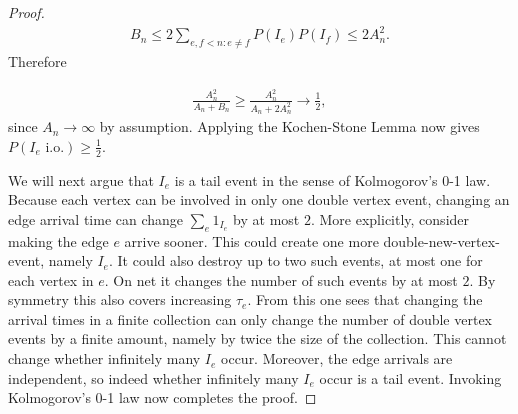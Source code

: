 \documentclass[12pt]{article}
\theoremstyle{definition}
\begin{document}
\begin{proof}
\begin{align*}
    B_n \leq 2\sum_{e,f < n: e \neq f} P(I_e)P(I_f) \leq 2A_n^2. 
\end{align*}
Therefore

\begin{align*}
    \frac{A_n^2}{A_n + B_n} \geq \frac{A_n^2}{A_n+2A_n^2} \rightarrow \frac{1}{2},
\end{align*}
since $A_n \rightarrow \infty$ by assumption.
Applying the Kochen-Stone Lemma \cite{yan_2006_a} now gives $P(I_e \text{ i.o.}) \geq \frac{1}{2}$.

We will next argue that $I_e$  is a tail event in the sense of Kolmogorov's 0-1 law. Because each vertex can be involved in only one double vertex event, changing an edge arrival time can change $\sum_e 1_{I_e}$ by at most $2$. More explicitly, consider making the edge $e$ arrive sooner. This could create one more double-new-vertex-event, namely $I_e$. It could also destroy up to two such events, at most one for each vertex in $e$. On net it changes the number of such events by at most $2$. By symmetry this also covers increasing $\tau_e$. From this one sees that changing the arrival times in a finite collection can only change the number of double vertex events by a finite amount, namely by twice the size of the collection. This cannot change whether infinitely many $I_e$ occur. Moreover, the edge arrivals are independent, so indeed whether infinitely many $I_e$ occur is a tail event. Invoking Kolmogorov's 0-1 law now completes the proof.
\end{proof}
\end{document}
